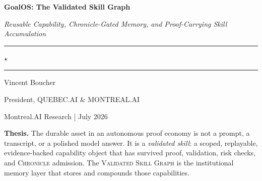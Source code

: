 \documentclass[10.5pt]{article}
\theoremstyle{goThm}
\newcommand{\vsg}{\textsc{Validated Skill Graph}}
\newcommand{\chronicle}{\textsc{Chronicle}}
\begin{document}
\begin{titlepage}
\centering
\vspace*{0.45in}
{\Huge\bfseries\color{goInk} GoalOS: The Validated Skill Graph\par}
\vspace{0.18in}
{\Large\itshape\color{goNavy} Reusable Capability, Chronicle-Gated Memory, and Proof-Carrying Skill Accumulation\par}
\vspace{0.16in}
{\color{goGold}\rule{0.26\textwidth}{0.5pt}\hspace{0.8em}$\star$\hspace{0.8em}\rule{0.26\textwidth}{0.5pt}\par}
\vspace{0.25in}
{\large Vincent Boucher\par}
{\normalsize President, QUEBEC.AI \& MONTREAL.AI\par}
\vspace{0.2in}
{\small Montreal.AI Research \;|\; July 2026\par}

\vspace{0.42in}
\begin{thesisbox}
\large\textbf{Thesis.} The durable asset in an autonomous proof economy is not a prompt, a transcript, or a polished model answer. It is a \emph{validated skill}: a scoped, replayable, evidence-backed capability object that has survived proof, validation, risk checks, and \chronicle{} admission. The \vsg{} is the institutional memory layer that stores and compounds those capabilities.
\end{thesisbox}


\end{titlepage}
\end{document}

